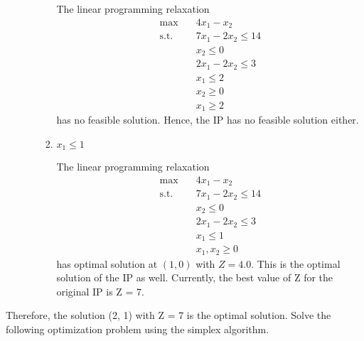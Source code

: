 \documentclass{homework}
\begin{document}
\begin{enumerate}
\begin{enumerate}[label*=\arabic*.]
\begin{enumerate}[label*=\arabic*.]
The linear programming relaxation
\begin{align*}
	\text{max} \quad
	&4x_1 - x_2 \\
	\text{s.t.} \quad
	&7x_1 - 2x_2 \leq 14 \\
	&x_2 \leq 0 \\
	&2x_1 - 2x_2 \leq 3 \\
	&x_1 \leq 2 \\
	&x_2 \geq 0 \\
	&x_1 \geq 2
\end{align*}
has no feasible solution. Hence, the IP has no feasible solution either.
\item $x_1 \leq 1$

The linear programming relaxation
\begin{align*}
	\text{max} \quad
	&4x_1 - x_2 \\
	\text{s.t.} \quad
	&7x_1 - 2x_2 \leq 14 \\
	&x_2 \leq 0 \\
	&2x_1 - 2x_2 \leq 3 \\
	&x_1 \leq 1 \\
	&x_1, x_2 \geq 0
\end{align*}
has optimal solution at $(1, 0)$ with $Z = 4.0$. This is the optimal solution of the IP as well. Currently, the
best value of Z for the original IP is Z = 7.
\end{enumerate}
\end{enumerate}
\end{enumerate}
\begin{center}
\end{center}
Therefore, the solution (2, 1) with Z = 7 is the optimal solution.
\exercise
Solve the following optimization problem using the simplex algorithm.
\end{document}
